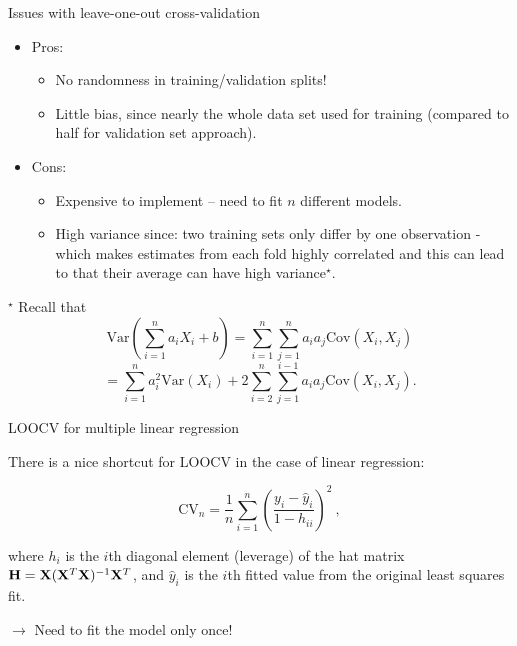 \documentclass[10pt,ignorenonframetext,]{beamer}
\providecommand{\tightlist}{%
  \setlength{\itemsep}{0pt}\setlength{\parskip}{0pt}}
\begin{document}
\begin{frame}[fragile]
\normalsize

\end{frame}

\begin{frame}

\begin{block}{Issues with leave-one-out cross-validation}

\vspace{1mm}

\begin{itemize}
\tightlist
\item
  Pros:

  \begin{itemize}
  \tightlist
  \item
    No randomness in training/validation splits!
  \item
    Little bias, since nearly the whole data set used for training
    (compared to half for validation set approach).
  \end{itemize}
\item
  Cons:

  \begin{itemize}
  \tightlist
  \item
    Expensive to implement -- need to fit \(n\) different models.
  \item
    High variance since: two training sets only differ by one
    observation - which makes estimates from each fold highly correlated
    and this can lead to that their average can have high
    variance\(^\star\).
  \end{itemize}
\end{itemize}

\tiny
\(^\star\) Recall that
\[\text{Var}(\sum_{i=1}^na_iX_i+b)=\sum_{i=1}^n\sum_{j=1}^n a_ia_j\text{Cov}(X_i,X_j)\]
\[=\sum_{i=1}^na_i^2\text{Var}(X_i)+2\sum_{i=2}^n \sum_{j=1}^{i-1}
a_ia_j\text{Cov}(X_i,X_j).\]

\end{block}

\end{frame}

\begin{frame}

\begin{block}{LOOCV for multiple linear regression}

\vspace{2mm}

There is a nice shortcut for LOOCV in the case of linear regression:

\[ \text{CV}_{n}=\frac{1}{n}\sum_{i=1}^n \left( \frac{y_i-\hat{y}_i}{1-h_{ii}} \right) ^2 \ ,\]

where \(h_i\) is the \(i\)th diagonal element (leverage) of the hat
matrix \({\bf H}={\bf X}({\bf X}^T{\bf X})^{-1}{\bf X}^T\), and
\(\hat{y}_i\) is the \(i\)th fitted value from the original least
squares fit.

\vspace{2mm}

\(\rightarrow\) Need to fit the model only once!

\end{block}

\end{frame}
\end{document}
